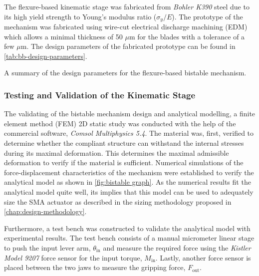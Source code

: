 The flexure-based kinematic stage was fabricated from \textit{Bohler K390} steel due to its high yield strength to Young's modulus ratio ($\sigma_y/E$). The prototype of the mechanism was fabricated using wire-cut electrical discharge machining (EDM) which allows a minimal thickness of 50 $\mu$m for the blades with a tolerance of a few $\mu$m. The design parameters of the fabricated prototype can be found in \cref{tab:bb-design-parameters}.

\begin{table}[hbt!]
    \centering
    \caption{A summary of the design parameters for the flexure-based bistable mechanism.}
    \label{tab:bb-design-parameters}
    
\end{table}

\subsubsection{Testing and Validation of the Kinematic Stage}
The validating of the bistable mechanism design and analytical modelling, a finite element method (FEM) 2D static study was conducted with the help of the commercial software, \textit{Comsol Multiphysics 5.4}. The material was, first, verified to determine whether the compliant structure can withstand the internal stresses during its maximal deformation. This determines the maximal admissible deformation to verify if the material is sufficient. Numerical simulations of the force-displacement characteristics of the mechanism were established to verify the analytical model as shown in \cref{fig:bistable graph}. As the numerical results fit the analytical model quite well, its implies that this model can be used to adequately size the SMA actuator as described in the sizing methodology proposed in \cref{chap:design-methodology}.

Furthermore, a test bench was constructed to validate the analytical model with experimental results. The test bench consists of a manual micrometer linear stage to push the input lever arm, $\theta_\mathrm{in}$ and measure the required force using the \textit{Kistler Model 9207} force sensor for the input torque, $M_\mathrm{in}$. Lastly, another force sensor is placed between the two jaws to measure the gripping force, $F_\mathrm{out}$.


